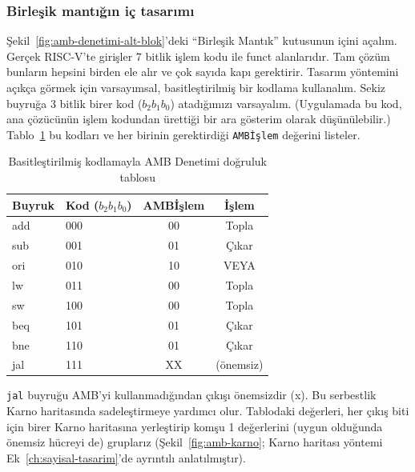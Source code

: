 \subsubsection*{Birleşik mantığın iç tasarımı}

Şekil~\ref{fig:amb-denetimi-alt-blok}'deki ``Birleşik Mantık'' kutusunun içini açalım. Gerçek RISC-V'te girişler 7 bitlik işlem kodu ile funct alanlarıdır. Tam çözüm bunların hepsini birden ele alır ve çok sayıda kapı gerektirir. Tasarım yöntemini açıkça görmek için varsayımsal, basitleştirilmiş bir kodlama kullanalım. Sekiz buyruğa 3 bitlik birer kod ($b_2 b_1 b_0$) atadığımızı varsayalım. (Uygulamada bu kod, ana çözücünün işlem kodundan ürettiği bir ara gösterim olarak düşünülebilir.) Tablo~\ref{tab:amb-denetim-dogruluk} bu kodları ve her birinin gerektirdiği \texttt{AMBİşlem} değerini listeler.

\begin{table}[htbp]
\centering
\caption{Basitleştirilmiş kodlamayla AMB Denetimi doğruluk tablosu}
\label{tab:amb-denetim-dogruluk}
\begin{tabular}{llcc}
\toprule
\textbf{Buyruk} & \textbf{Kod} ($b_2 b_1 b_0$) & \textbf{AMBİşlem} & \textbf{İşlem} \\
\midrule
add & 000 & 00 & Topla \\
sub & 001 & 01 & Çıkar \\
ori & 010 & 10 & VEYA \\
lw  & 011 & 00 & Topla \\
sw  & 100 & 00 & Topla \\
beq & 101 & 01 & Çıkar \\
bne & 110 & 01 & Çıkar \\
jal & 111 & XX & (önemsiz) \\
\bottomrule
\end{tabular}
\end{table}

\texttt{jal} buyruğu AMB'yi kullanmadığından çıkışı önemsizdir (x). Bu serbestlik Karno haritasında sadeleştirmeye yardımcı olur. Tablodaki değerleri, her çıkış biti için birer Karno haritasına yerleştirip komşu 1 değerlerini (uygun olduğunda önemsiz hücreyi de) gruplarız (Şekil~\ref{fig:amb-karno}; Karno haritası yöntemi Ek~\ref{ch:sayisal-tasarim}'de ayrıntılı anlatılmıştır).

